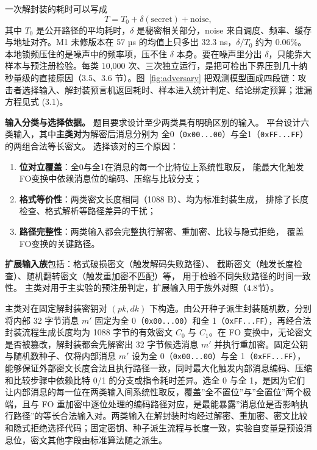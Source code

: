 一次解封装的耗时可以写成
\begin{equation}\tag{3.1}
T = T_0 + \delta(\text{secret}) + \text{noise},
\end{equation}
其中 $T_0$ 是公开路径的平均耗时，$\delta$ 是秘密相关部分，noise 来自调度、频率、缓存与地址对齐。M1 未修版本在 57 µs 的均值上只多出 32.3 ns，$\delta/T_0$ 约为 0.06\%。本地锁频压住的是噪声中的频率项，压不住 $\delta$ 本身。要在噪声里分出 $\delta$，只能靠大样本与预注册检验。每类 10,000 次、三次独立运行，是把可检出下界压到几十纳秒量级的直接原因（3.5、3.6 节）。图~\ref{fig:adversary} 把观测模型画成四段链：攻击者选择输入、解封装预言机返回耗时、样本进入统计判定、结论绑定预算；泄漏方程见式 (3.1)。 %

\textbf{输入分类与选择依据。}
题目要求设计至少两类具有明确区别的输入。
平台设计六类输入，其中\textbf{主类对}为解密后消息分别为
全0（\texttt{0x00...00}）与全1（\texttt{0xFF...FF}）的两组合法等长密文。
选择该对的三个原因：

\begin{enumerate}[label=(\arabic*)]
\item \textbf{位对立覆盖}：全0与全1在消息的每一个比特位上系统性取反，
能最大化触发FO变换中依赖消息位的编码、压缩与比较分支；
\item \textbf{格式等价性}：两类密文长度相同（1088 B）、均为标准封装生成，
排除了长度检查、格式解析等路径差异的干扰；
\item \textbf{路径完整性}：两类输入都会完整执行解密、重加密、比较与隐式拒绝，
覆盖FO变换的关键路径。
\end{enumerate}

\textbf{扩展输入族}包括：格式破损密文（触发解码失败路径）、
截断密文（触发长度检查）、随机翻转密文（触发重加密不匹配）等，
用于检验不同失败路径的时间一致性。
主类对用于主实验的预注册判定，扩展输入用于族外对照（4.8节）。

主类对在固定解封装密钥对 $(pk,dk)$ 下构造。由公开种子派生封装随机数，分别将内部 32 字节消息 $m'$ 固定为全 0（\texttt{0x00...00}）和全 1（\texttt{0xFF...FF}），再经合法封装流程生成长度均为 1088 字节的有效密文 $C_0$ 与 $C_1$。在 FO 变换中，无论密文是否被篡改，解封装都会先解密出 32 字节候选消息 $m'$ 并执行重加密。固定公钥与随机数种子、仅将内部消息 $m'$ 设为全 0（\texttt{0x00...00}）与全 1（\texttt{0xFF...FF}），能够保证外部密文长度合法且执行路径一致，同时最大化触发内部消息编码、压缩和比较步骤中依赖比特 0/1 的分支或指令耗时差异。选全 0 与全 1，是因为它们让内部消息的每一位在两类输入间系统性取反，覆盖”全不置位”与”全置位”两个极端，且与 FO 重加密中逐位处理的编码路径对应，是最能暴露”消息位是否影响执行路径”的等长合法输入对。两类输入在解封装时均经过解密、重加密、密文比较和隐式拒绝选择代码；固定密钥、种子派生流程与长度一致，实验自变量是预设消息位，密文其他字段由标准算法随之派生。

